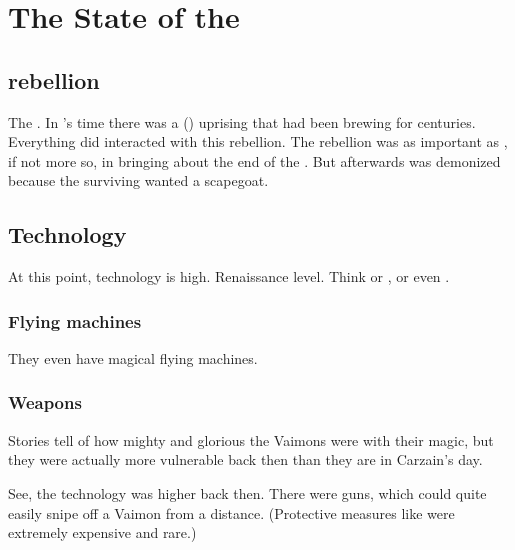 \section{The State of the \Caliphate}









\subsection[Scatha rebellion]{\Scatha rebellion}
The \VaimonCaliphate {}. 
In \Belzir's time there was a \scathaese (\Ortaican) uprising that had been brewing for centuries. 
Everything \Belzir did interacted with this rebellion. 
The rebellion was as important as \Belzir, if not more so, in bringing about the end of the \caliphate. 
But afterwards \Belzir was demonized because the surviving \VaimonClans wanted a scapegoat. 









\subsection{Technology}
At this point, technology is high. 
Renaissance level. 
Think  or , or even . 





\subsubsection{Flying machines}
They even have magical flying machines. 





\subsubsection{Weapons}
Stories tell of how mighty and glorious the Vaimons were with their magic, but they were actually more vulnerable back then than they are in Carzain's day. 

See, the technology was higher back then. 
There were guns, which could quite easily snipe off a Vaimon from a distance. 
(Protective measures like  were extremely expensive and rare.) 

